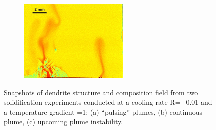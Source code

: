 \begin{figure}[htbp]
\begin{subfigure}{0.3\textwidth}
	\caption{}
    \label{fig:exp_continuous}
  \end{subfigure}
   \begin{subfigure}{0.3\textwidth}
    \centering
	\includegraphics[width=\textwidth]{Chapter3/Graphics/freckle_exp/exp_instability.png}
	\caption{}
    \label{fig:exp_instability}
  \end{subfigure}
\caption{Snapshots of dendrite structure and composition field from two 
solidification experiments conducted at a cooling rate 
R=\SI{-0.01}{\uCR} and a temperature gradient =\SI{1}{\ugradT}: (a) “pulsing” plumes, 
(b) continuous plume, (c) upcoming plume instability.} 
\label{fig:experimental_freckles_regimes}
\end{figure}
%
%
